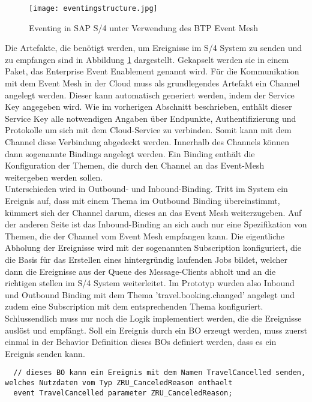   \begin{figure}[H]
    \centering
    \texttt{[image: eventingstructure.jpg]}
    \caption[Eventing in SAP S/4]{Eventing in SAP S/4 unter Verwendung des BTP Event Mesh \footnotemark}
    \label{BEstructure}
  \end{figure}

  Die Artefakte, die benötigt werden, um Ereignisse im S/4 System zu senden und zu empfangen sind in Abbildung \ref{BEstructure} dargestellt. Gekapselt werden sie in einem Paket, das Enterprise Event Enablement genannt wird. Für die Kommunikation mit dem Event Mesh in der Cloud muss als grundlegendes Artefakt ein Channel angelegt werden. Dieser kann automatisch generiert werden, indem der Service Key angegeben wird. Wie im vorherigen Abschnitt beschrieben, enthält dieser Service Key alle notwendigen Angaben über Endpunkte, Authentifizierung und Protokolle um sich mit dem Cloud-Service zu verbinden. Somit kann mit dem Channel diese Verbindung abgedeckt werden. Innerhalb des Channels können dann sogenannte Bindings angelegt werden. Ein Binding enthält die Konfiguration der Themen, die durch den Channel an das Event-Mesh weitergeben werden sollen.\\ Unterschieden wird in Outbound- und Inbound-Binding. Tritt im System ein Ereignis auf, dass mit einem Thema im Outbound Binding übereinstimmt, kümmert sich der Channel darum, dieses an das Event Mesh weiterzugeben. Auf der anderen Seite ist das Inbound-Binding an sich auch nur eine Spezifikation von Themen, die der Channel vom Event Mesh empfangen kann. Die eigentliche Abholung der Ereignisse wird mit der sogenannten Subscription konfiguriert, die die Basis für das Erstellen eines hintergründig laufenden Jobs bildet, welcher dann die Ereignisse aus der Queue des Message-Clients abholt und an die richtigen stellen im S/4 System weiterleitet. Im Prototyp wurden also Inbound und Outbound Binding mit dem Thema 'travel.booking.changed' angelegt und zudem eine Subscription mit dem entsprechenden Thema konfiguriert.\\

Schlussendlich muss nur noch die Logik implementiert werden, die die Ereignisse auslöst und empfängt. Soll ein Ereignis durch ein \ac{BO} erzeugt werden, muss zuerst einmal in der Behavior Definition dieses \acp{BO} definiert werden, dass es ein Ereignis senden kann. 

\begin{lstlisting}
  // dieses BO kann ein Ereignis mit dem Namen TravelCancelled senden, welches Nutzdaten vom Typ ZRU_CanceledReason enthaelt
  event TravelCancelled parameter ZRU_CanceledReason;
\end{lstlisting}

